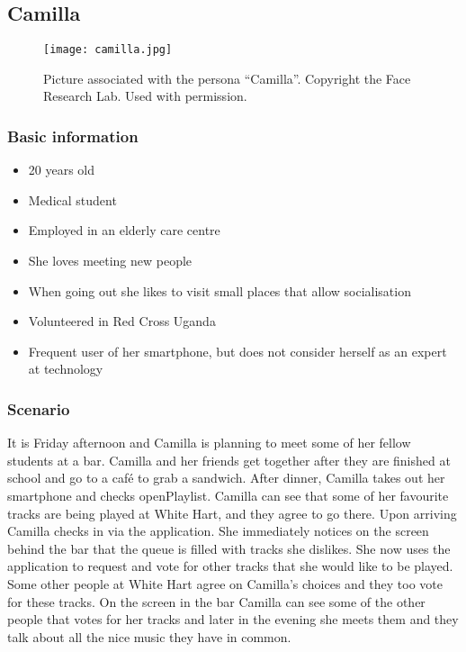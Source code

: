 \subsection{Camilla}
\begin{figure}[hbtp]
  \centering
  \texttt{[image: camilla.jpg]}
  \caption[Persona \enquote{Camilla}.]{Picture associated with the persona \enquote{Camilla}. Copyright the Face Research Lab. Used with permission.}\label{fig:camilla}
\end{figure}

\subsubsection{Basic information}
\begin{itemize}
\item 20 years old
\item Medical student
\item Employed in an elderly care centre
\item She loves meeting new people
\item When going out she likes to visit small places that allow socialisation
\item Volunteered in Red Cross Uganda
\item Frequent user of her smartphone, but does not consider herself as an expert at technology
\end{itemize}

\subsubsection{Scenario}
It is Friday afternoon and Camilla is planning to meet some of her fellow students at a bar. Camilla and her friends get together after they are finished at school and go to a café to grab a sandwich. After dinner, Camilla takes out her smartphone and checks openPlaylist. Camilla can see that some of her favourite tracks are being played at White Hart, and they agree to go there. Upon arriving Camilla checks in via the application. She immediately notices on the screen behind the bar that the queue is filled with tracks she dislikes. She now uses the application to request and vote for other tracks that she would like to be played. Some other people at White Hart agree on Camilla's choices and they too vote for these tracks. On the screen in the bar Camilla can see some of the other people that votes for her tracks and later in the evening she meets them and they talk about all the nice music they have in common.
